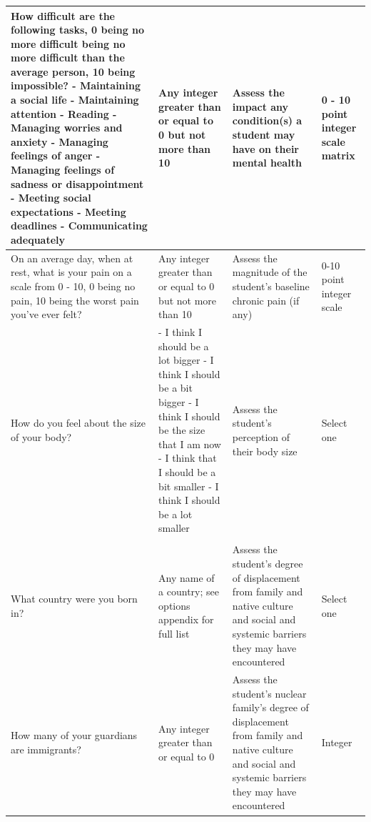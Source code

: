 \documentclass[10pt, twocolumn]{article}
\begin{document}
\begin{xltabular}{\textwidth}{|p{0.3\textwidth}|p{0.3\textwidth}|p{0.2\textwidth}|X|}
    How difficult are the following tasks, 0 being no more difficult being no more difficult than the average person, 10 being impossible? \newline - Maintaining a social life \newline - Maintaining attention \newline - Reading \newline - Managing worries and anxiety \newline - Managing feelings of anger \newline - Managing feelings of sadness or disappointment \newline - Meeting social expectations \newline - Meeting deadlines \newline - Communicating adequately & Any integer greater than or equal to 0 but not more than 10  & Assess the impact any condition(s) a student may have on their mental health & 0 - 10 point integer scale matrix \\ \hline 
    On an average day, when at rest, what is your pain on a scale from 0 - 10, 0 being no pain, 10 being the worst pain you've ever felt? & Any integer greater than or equal to 0 but not more than 10  & Assess the magnitude of the student's baseline chronic pain (if any) & 0-10 point integer scale \\ \hline 
    How do you feel about the size of your body? & - I think I should be a lot bigger \newline - I think I should be a bit bigger \newline - I think I should be the size that I am now \newline - I think that I should be a bit smaller \newline - I think I should be a lot smaller & Assess the student's perception of their body size & Select one \\ \hline 
     \\ \hline
    What country were you born in? & Any name of a country; see options appendix for full list & Assess the student's degree of displacement from family and native culture and social and systemic barriers they may have encountered & Select one \\ \hline 
    How many of your guardians are immigrants? & Any integer greater than or equal to 0 & Assess the student's nuclear family's degree of displacement from family and native culture and social and systemic barriers they may have encountered & Integer \\ \hline

\end{xltabular}
\end{document}
